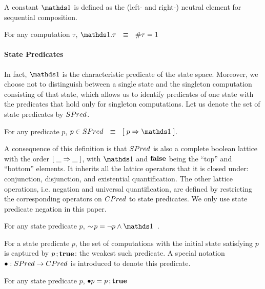 A constant $\one$ is defined as the (left- and right-) neutral element for
sequential composition.
\begin{Definition} For any computation $\tau$, $\one.\tau  \Wide{\eqv}  \size \tau = 1$
\end{Definition}

\paragraph{State Predicates}
In fact, $\one$ is the characteristic predicate of the state space.
Moreover, we choose not to distinguish between a single state and the
singleton computation consisting of that state, which allows us to identify
predicates of one state with the predicates that hold only for singleton
computations.  Let us denote the set of state predicates by 
$SPred$.
\begin{Definition} For any predicate $p$,
    $p \in \SPred \Wide{\eqv} \ew {p \implies \one}$.
\end{Definition}

A consequence of this definition is that $SPred$ is also a complete
boolean lattice with the order $[\;  \_ \Rightarrow \_ \;]$, with $\one$ and
$\mathbf{false}$ being the ``top'' and ``bottom'' elements.  It inherits all
the lattice operators that it is closed under: conjunction,
disjunction, and existential quantification.  The other lattice
operations, i.e. negation and universal quantification, are defined by
restricting the corresponding operators on $CPred$ to state
predicates.  We only use state predicate negation in this paper.
\begin{Definition} For
  any state predicate $p$,
  $\spneg p = \neg p \land \one$~.
\end{Definition}

For a state predicate $p$, the set of computations with the initial
state satisfying $p$ is captured by $p\,;\mathbf{true}$: the weakest such 
predicate.  A special notation $\bullet : SPred \rightarrow CPred$ 
is introduced to denote this predicate.
\begin{Definition} For any state predicate $p$,
  $\bullet p = p\,;\mathbf{true}$
\end{Definition}

